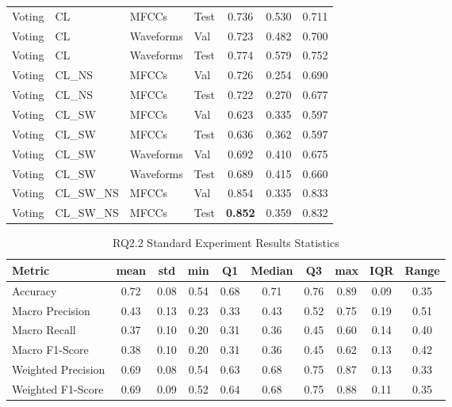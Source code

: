 \begin{longtable}{|l|l|l|l|c|c|c|}
Voting & CL & MFCCs & Test & 0.736 & 0.530 & 0.711 \\
Voting & CL & Waveforms & Val & 0.723 & 0.482 & 0.700 \\
Voting & CL & Waveforms & Test & 0.774 & 0.579 & 0.752 \\
Voting & CL\_NS & MFCCs & Val & 0.726 & 0.254 & 0.690 \\
Voting & CL\_NS & MFCCs & Test & 0.722 & 0.270 & 0.677 \\
Voting & CL\_SW & MFCCs & Val & 0.623 & 0.335 & 0.597 \\
Voting & CL\_SW & MFCCs & Test & 0.636 & 0.362 & 0.597 \\
Voting & CL\_SW & Waveforms & Val & 0.692 & 0.410 & 0.675 \\
Voting & CL\_SW & Waveforms & Test & 0.689 & 0.415 & 0.660 \\
Voting & CL\_SW\_NS & MFCCs & Val & 0.854 & 0.335 & 0.833 \\
Voting & CL\_SW\_NS & MFCCs & Test & \textbf{0.852} & 0.359 & 0.832 \\
\end{longtable}

\begin{table}[h]
\caption{RQ2.2 Standard Experiment Results Statistics}
\label{tab:rq2.2_Standard_Results_Statistics}
\begin{tabular}{|l|c|c|c|c|c|c|c|c|c|}
\toprule
Metric & mean & std & min & Q1 & Median & Q3 & max & IQR & Range \\
\midrule
Accuracy & 0.72 & 0.08 & 0.54 & 0.68 & 0.71 & 0.76 & 0.89 & 0.09 & 0.35 \\
Macro Precision & 0.43 & 0.13 & 0.23 & 0.33 & 0.43 & 0.52 & 0.75 & 0.19 & 0.51 \\
Macro Recall & 0.37 & 0.10 & 0.20 & 0.31 & 0.36 & 0.45 & 0.60 & 0.14 & 0.40 \\
Macro F1-Score & 0.38 & 0.10 & 0.20 & 0.31 & 0.36 & 0.45 & 0.62 & 0.13 & 0.42 \\
Weighted Precision & 0.69 & 0.08 & 0.54 & 0.63 & 0.68 & 0.75 & 0.87 & 0.13 & 0.33 \\
Weighted F1-Score & 0.69 & 0.09 & 0.52 & 0.64 & 0.68 & 0.75 & 0.88 & 0.11 & 0.35 \\
\bottomrule
\end{tabular}
\end{table}
